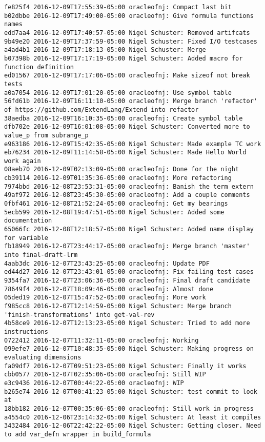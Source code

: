 \begin{lstlisting}
fe825f4 2016-12-09T17:55:39-05:00 oracleofnj: Compact last bit
b02dbbe 2016-12-09T17:49:00-05:00 oracleofnj: Give formula functions names
edd7aa4 2016-12-09T17:40:57-05:00 Nigel Schuster: Removed artifcats
9b49e20 2016-12-09T17:37:59-05:00 Nigel Schuster: Fixed I/O testcases
a4ad4b1 2016-12-09T17:18:13-05:00 Nigel Schuster: Merge
b07398b 2016-12-09T17:17:19-05:00 Nigel Schuster: Added macro for function definition
ed01567 2016-12-09T17:17:06-05:00 oracleofnj: Make sizeof not break tests
a0a7054 2016-12-09T17:01:20-05:00 oracleofnj: Use symbol table
56fd61b 2016-12-09T16:11:10-05:00 oracleofnj: Merge branch 'refactor' of https://github.com/ExtendLang/Extend into refactor
38aedba 2016-12-09T16:10:35-05:00 oracleofnj: Create symbol table
dfb702e 2016-12-09T16:01:08-05:00 Nigel Schuster: Converted more to value_p from subrange_p
e963186 2016-12-09T15:42:35-05:00 Nigel Schuster: Made example TC work
eb76234 2016-12-09T11:14:58-05:00 Nigel Schuster: Made Hello World work again
08aeb70 2016-12-09T02:13:09-05:00 oracleofnj: Done for the night
cb39114 2016-12-09T01:35:36-05:00 oracleofnj: More refactoring
7974bbd 2016-12-08T23:53:31-05:00 oracleofnj: Banish the term extern
49af972 2016-12-08T23:45:30-05:00 oracleofnj: Add a couple comments
0fbf461 2016-12-08T21:52:24-05:00 oracleofnj: Get my bearings
5ecb599 2016-12-08T19:47:51-05:00 Nigel Schuster: Added some documentation
65066fc 2016-12-08T12:18:57-05:00 Nigel Schuster: Added name display for variable
fb18949 2016-12-07T23:44:17-05:00 oracleofnj: Merge branch 'master' into final-draft-lrm
4aab3dc 2016-12-07T23:43:25-05:00 oracleofnj: Update PDF
ed44d27 2016-12-07T23:43:01-05:00 oracleofnj: Fix failing test cases
9354fa7 2016-12-07T23:06:36-05:00 oracleofnj: Final draft candidate
78649f4 2016-12-07T18:09:46-05:00 oracleofnj: Almost done
05ded19 2016-12-07T15:47:52-05:00 oracleofnj: More work
f985cc8 2016-12-07T12:14:59-05:00 Nigel Schuster: Merge branch 'finish-transformations' into get-val-rev
4b58ce9 2016-12-07T12:13:23-05:00 Nigel Schuster: Tried to add more instructions
0722412 2016-12-07T11:32:11-05:00 oracleofnj: Working
099efe7 2016-12-07T10:48:35-05:00 Nigel Schuster: Making progress on evaluating dimensions
fa09df7 2016-12-07T09:51:23-05:00 Nigel Schuster: Finally it works
cbb0577 2016-12-07T02:35:06-05:00 oracleofnj: Still WIP
e3c9436 2016-12-07T00:44:22-05:00 oracleofnj: WIP
b265e74 2016-12-07T00:41:23-05:00 Nigel Schuster: test commit to look at
18bb182 2016-12-07T00:35:06-05:00 oracleofnj: Still work in progress
a4554c0 2016-12-06T23:14:32-05:00 Nigel Schuster: At least it compiles
3432484 2016-12-06T22:42:22-05:00 Nigel Schuster: Getting closer. Need to add var_defn wrapper in build_formula

\end{lstlisting}
